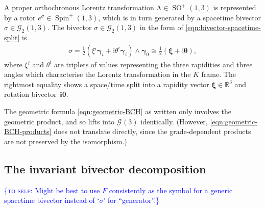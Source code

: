 \documentclass[12pt,a4paper]{article}
\makeatletter
\newif\iffinal
\newcommand{\toself}[1]{\iffinal\else\textcolor{blue}{\{\textsc{to self:} #1\}}\fi}
\newcommand\x[1]{\@nameuse{\detokenize{#1}}}
\renewcommand{\vb}[1]{\boldsymbol{#1}}
\newcommand{\vg}[1]{\vb{\gamma}_{#1}}
\newcommand{\GA}[1][]{\mathcal{G}_{#1}}
\newcommand{\linmap}[1]{\mathrm{#1}}
\newcommand{\vol}{\mathbb{i}}
\newcommand{\RR}{\mathds{R}}
\DeclareMathOperator{\SO}{SO}
\DeclareMathOperator{\Spin}{Spin}
\makeatother
\begin{document}
A proper orthochronous Lorentz transformation $\linmap \Lambda{} \in \SO^+(1,3)$ is represented by a rotor $e^\sigma{} \in \Spin^+(1,3)$, which is in turn generated by a spacetime bivector $\sigma{} \in \GA[2](1,3)$.
The bivector $\sigma{} \in \GA[2](1,3)$ in the form of \eqref{eqn:bivector-spacetime-split} is
\begin{align}
	\sigma{} = \frac12(\xi{}^i \vg i + \vol \theta^i \vg i) \wedge \vg 0
	\cong \frac12(\vb \xi{} + \vol \vb \theta)
	\label{eqn:bivector-generator}
,\end{align}
where $\xi{}^i$ and $\theta^i$ are triplets of values representing the three rapidities and three angles which characterise the Lorentz transformation in the $K$ frame.
The rightmost equality shows a space/time split into a rapidity vector $\vb \xi{} \in \RR^3$ and rotation bivector~$\vol\vb \theta$.

The geometric \x{BCH} formula \eqref{eqn:geometric-BCH} as written only involves the geometric product, and so lifts into $\GA(3)$ identically.
(However, \eqref{eqn:geometric-BCH-products} does not translate directly, since the grade-dependent products are not preserved by the isomorphism.)



\subsection{The invariant bivector decomposition}
\label{sec:invariant-bivector-decomposition}

\toself{Might be best to use $F$ consistently as the symbol for a generic spacetime bivector instead of `$\sigma{}$' for ``generator''.}
\end{document}
